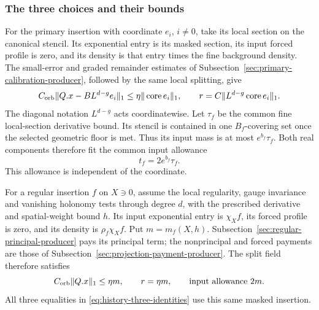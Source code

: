 \subsubsection{The three choices and their bounds}
For the primary insertion with coordinate $e_i$, $i\ne0$, take
its local section on the canonical stencil. Its exponential entry
is its masked section, its input forced profile is zero, and its
density is that entry times the fine background density. The
small-error and graded remainder estimates of
Subsection~\ref{sec:primary-calibration-producer}, followed by the
same local splitting, give
\[
 C_{\rm orb}\|Q.x-BL^{d-g}e_i\|_1
       \le\eta\|\operatorname{core}e_i\|_1,
 \qquad r=C\|L^{d-g}\operatorname{core}e_i\|_1.
\]
The diagonal notation $L^{d-g}$ acts coordinatewise. Let $\tau_f$
be the common fine local-section derivative bound. Its stencil is
contained in one $B_f$-covering set once the selected geometric
floor is met. Thus its input mass is at most $e^{b_f}\tau_f$.
Both real components therefore fit the common input allowance
\begin{equation}\label{eq:history-common-waybill}
                            t_f=2e^{b_f}\tau_f.
\end{equation}
This allowance is independent of the coordinate.

For a regular insertion $f$ on $X\ni0$, assume the local regularity,
gauge invariance and vanishing holonomy tests through degree $d$,
with the prescribed derivative and spatial-weight bound $h$.
Its input exponential entry is $\chi_X f$, its forced profile is
zero, and its density is $\rho_f\chi_X f$. Put $m=m_f(X,h)$.
Subsection~\ref{sec:regular-principal-producer} pays its principal
term; the nonprincipal and forced payments are those of
Subsection~\ref{sec:projection-payment-producer}. The split field
therefore satisfies
\[
          C_{\rm orb}\|Q.x\|_1\le\eta m,
          \qquad r=\eta m,
          \qquad\text{input allowance }2m.
\]
All three equalities in \eqref{eq:history-three-identities} use
this same masked insertion.

